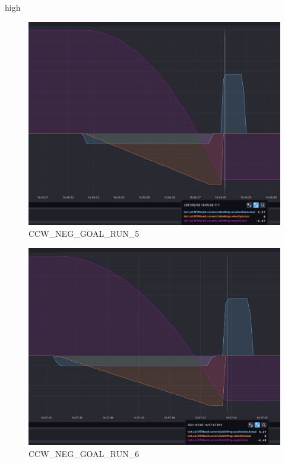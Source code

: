 high\documentclass[SE,lsstdraft,authoryear,toc]{lsstdoc}
\begin{document}
\begin{figure}[h!]
  \includegraphics[width=\linewidth]{media/CCW_high_speed_neg_test5.png}
  \caption{CCW\_NEG\_GOAL\_RUN\_5}
  \label{fig:CCW_NEG_GOAL_RUN_5}
\end{figure}
\begin{figure}[h!]
  \includegraphics[width=\linewidth]{media/CCW_high_speed_neg_test6.png}
  \caption{CCW\_NEG\_GOAL\_RUN\_6}
  \label{fig:CCW_NEG_GOAL_RUN_6}
\end{figure}
\end{document}
